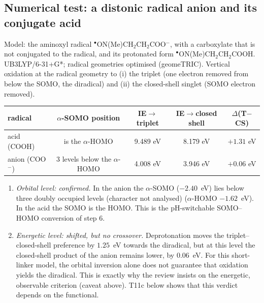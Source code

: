 \subsection{Numerical test: a distonic radical anion and its conjugate acid}
Model: the aminoxyl radical $^\bullet$ON(Me)CH$_2$CH$_2$COO$^-$, with a carboxylate that is not conjugated to
the radical, and its protonated form $^\bullet$ON(Me)CH$_2$CH$_2$COOH. UB3LYP/6-31+G*; radical geometries
optimised (geomeTRIC). Vertical oxidation at the radical geometry to (i) the triplet (one electron removed
from below the SOMO, the diradical) and (ii) the closed-shell singlet (SOMO electron removed).
\begin{center}
\begin{tabular}{lcccc}
\toprule
radical & $\alpha$-SOMO position & IE$\to$triplet & IE$\to$closed shell & $\Delta$(T$-$CS)\\
\midrule
acid (COOH) & is the $\alpha$-HOMO & 9.489 eV & 8.179 eV & $+1.31$ eV\\
anion (COO$^-$) & 3 levels below the $\alpha$-HOMO & 4.008 eV & 3.946 eV & $+0.06$ eV\\
\bottomrule
\end{tabular}
\end{center}
\begin{enumerate}
  \item \emph{Orbital level: confirmed.} In the anion the $\alpha$-SOMO ($-2.40$~eV) lies below three doubly
        occupied levels (character not analysed) ($\alpha$-HOMO $-1.62$~eV). In the acid the SOMO is the HOMO. This is
        the pH-switchable SOMO--HOMO conversion of step 6.
  \item \emph{Energetic level: shifted, but no crossover.} Deprotonation moves the
        triplet--closed-shell preference by $1.25$~eV towards the diradical, but at this level the closed-shell
        product of the anion remains lower, by $0.06$~eV. For this short-linker model, the orbital inversion
        alone does not guarantee that oxidation yields the diradical. This is exactly why the review insists on
        the energetic, observable criterion (caveat above). T11c below shows that this verdict depends on the
        functional.
\end{enumerate}

